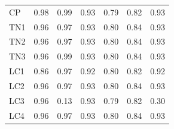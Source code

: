 \documentclass[./dissertation.tex]{subfiles}
\begin{document}
\begin{table}[htbp]
\begin{tabular}{|l|c|c|c|c|c|c|}
        CP                        & 0.98                                    & 0.99                                        & 0.93                                    & 0.79                                  & 0.82                                   & 0.93                                    \\
        TN1                       & 0.96                                    & 0.97                                        & 0.93                                    & 0.80                                  & 0.84                                   & 0.93                                    \\
        TN2                       & 0.96                                    & 0.97                                        & 0.93                                    & 0.80                                  & 0.84                                   & 0.93                                    \\
        TN3                       & 0.96                                    & 0.99                                        & 0.93                                    & 0.80                                  & 0.84                                   & 0.93                                    \\
        LC1                       & 0.86                                    & 0.97                                        & 0.92                                    & 0.80                                  & 0.82                                   & 0.92                                    \\
        LC2                       & 0.96                                    & 0.97                                        & 0.93                                    & 0.80                                  & 0.84                                   & 0.93                                    \\
        LC3                       & 0.96                                    & 0.13                                        & 0.93                                    & 0.79                                  & 0.82                                   & 0.30                                    \\
        LC4                       & 0.96                                    & 0.97                                        & 0.93                                    & 0.80                                  & 0.84                                   & 0.93                                    \\
        \bottomrule
    \end{tabular}
\end{table}
\end{document}
